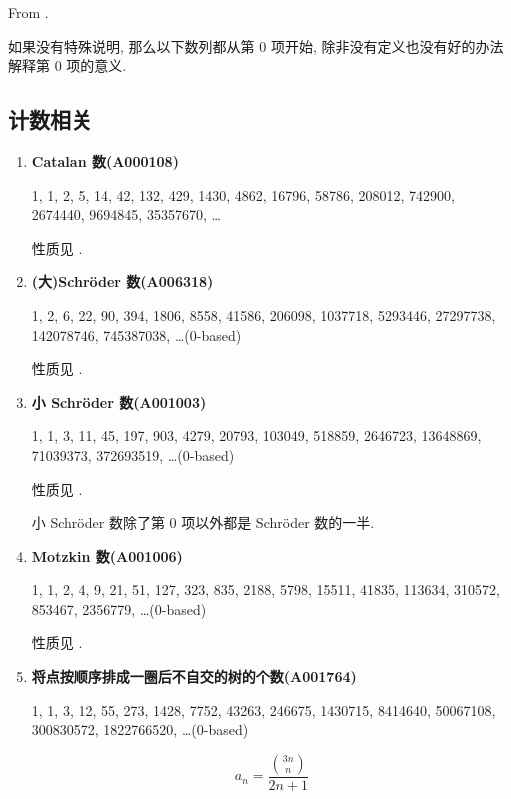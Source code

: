 From \cite{antileafstandard}.

如果没有特殊说明, 那么以下数列都从第 \(0\) 项开始, 除非没有定义也没有好的办法解释第 \(0\) 项的意义.

\subsection{计数相关}

\begin{enumerate}
    \item \textbf{Catalan 数(A000108)}
          
          1, 1, 2, 5, 14, 42, 132, 429, 1430, 4862, 16796, 58786, 208012, 742900, 2674440, 9694845, 35357670, \dots
          
          性质见 .
          
    \item \textbf{(大)Schr\"oder 数(A006318)}
          
          1, 2, 6, 22, 90, 394, 1806, 8558, 41586, 206098, 1037718, 5293446, 27297738, 142078746, 745387038, \dots \;(0-based)
          
          性质见 .
          
    \item \textbf{小 Schr\"oder 数(A001003)}
          
          1, 1, 3, 11, 45, 197, 903, 4279, 20793, 103049, 518859, 2646723, 13648869, 71039373, 372693519, \dots \;(0-based)
          
          性质见 .
          
          小 Schr\"oder 数除了第 \(0\) 项以外都是 Schr\"oder 数的一半.
          
    \item \textbf{Motzkin 数(A001006)}
          
          1, 1, 2, 4, 9, 21, 51, 127, 323, 835, 2188, 5798, 15511, 41835, 113634, 310572, 853467, 2356779, \dots \;(0-based)
          
          性质见 .
          
    \item \textbf{将点按顺序排成一圈后不自交的树的个数(A001764)}
          
          1, 1, 3, 12, 55, 273, 1428, 7752, 43263, 246675, 1430715, 8414640, 50067108, 300830572, 1822766520, \dots \;(0-based)
          
          \[
              a_n = \frac {{3n \choose n}} {2n + 1}
          \]
          

\end{enumerate}
